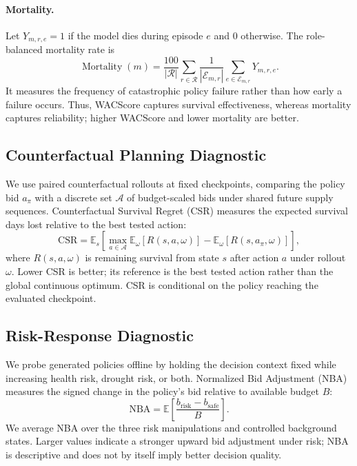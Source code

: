 \documentclass[letterpaper]{article} %
\begin{document}
\paragraph{Mortality.}
Let $Y_{m,r,e}=1$ if the model dies during episode $e$ and $0$ otherwise.
The role-balanced mortality rate is
\begin{equation}
    \operatorname{Mortality}(m)
    =
    \frac{100}{|\mathcal{R}|}
    \sum_{r\in\mathcal{R}}
    \frac{1}{|\mathcal{E}_{m,r}|}
    \sum_{e\in\mathcal{E}_{m,r}}Y_{m,r,e}.
\end{equation}
It measures the frequency of catastrophic policy failure rather than
how early a failure occurs. Thus, WACScore captures survival effectiveness,
whereas mortality captures reliability; higher WACScore and lower
mortality are better.

\subsection{Counterfactual Planning Diagnostic}

We use paired counterfactual rollouts at fixed checkpoints, comparing
the policy bid $a_\pi$ with a discrete set $\mathcal{A}$ of budget-scaled
bids under shared future supply sequences. Counterfactual Survival
Regret (CSR) measures the expected survival days lost relative to the
best tested action:
\begin{equation}
    \mathrm{CSR}
    =
    \mathbb{E}_{s}\!\left[
        \max_{a\in\mathcal{A}}
        \mathbb{E}_{\omega}[R(s,a,\omega)]
        -
        \mathbb{E}_{\omega}[R(s,a_\pi,\omega)]
    \right],
\end{equation}
where $R(s,a,\omega)$ is remaining survival from state $s$ after action
$a$ under rollout $\omega$. Lower CSR is better; its reference is the
best tested action rather than the global continuous optimum. CSR is
conditional on the policy reaching the evaluated checkpoint.

\subsection{Risk-Response Diagnostic}

We probe generated policies offline by holding the decision context
fixed while increasing health risk, drought risk, or both. Normalized
Bid Adjustment (NBA) measures the signed change in the policy's bid
relative to available budget $B$:
\begin{equation}
    \mathrm{NBA}
    =
    \mathbb{E}\!\left[
        \frac{b_{\mathrm{risk}}-b_{\mathrm{safe}}}{B}
    \right].
\end{equation}
We average NBA over the three risk manipulations and controlled
background states. Larger values indicate a stronger upward bid
adjustment under risk; NBA is descriptive and does not by itself imply
better decision quality.
\end{document}
